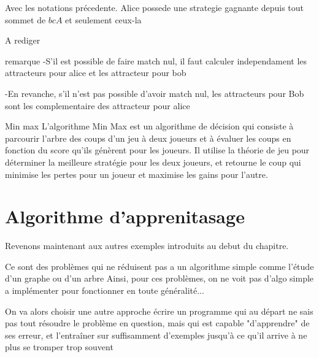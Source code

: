 \documentclass[a4paper,french,bookmarks]{article}
\begin{document}
    \begin{theorem}{}{}
        Avec les notations précedente. 
        Alice possede une strategie gagnante depuis tout sommet de $bcA$
        et seulement ceux-la 
    \end{theorem}
    \begin{nproof}{}{}
        A rediger
    \end{nproof}
    
    \begin{form}{remarque}{}
        \hspace{1cm}-S'il est possible de faire match nul, il faut calculer independament les attracteurs pour   alice et les attracteur pour bob
        
        
        \hspace{1cm}-En revanche, s'il n'est pas possible d'avoir match nul, les attracteurs pour Bob sont les complementaire des attracteur pour alice 
    \end{form}
    
    
    \begin{definition}{Min max}{}
        L'algorithme Min Max est un algorithme de décision qui consiste à parcourir l'arbre des coups d'un jeu à deux joueurs et à évaluer les coups en fonction du score qu'ils génèrent pour les joueurs. Il utilise la théorie de jeu pour déterminer la meilleure stratégie pour les deux joueurs, et retourne le coup qui minimise les pertes pour un joueur et maximise les gains pour l'autre.
        
    \end{definition}
    
    \section{Algorithme d'apprenitasage}
    
    Revenons maintenant aux autres exemples introduits au debut du chapitre.
    
    
        Ce sont des problèmes qui ne réduisent pas a un algorithme simple comme l'étude d'un graphe ou d'un arbre 
    Ainsi, pour ces problèmes, on ne voit pas d'algo simple a implémenter pour fonctionner en toute généralité...
    \vspace{0.1cm}
    
        On va alors choisir une autre approche écrire un programme qui au départ ne sais pas tout résoudre le problème
    en question, mais qui est capable "d'apprendre" de ses erreur, et l'entraîner sur suffisamment d'exemples jusqu'à ce qu'il arrive à ne plus se tromper trop souvent 
    
\end{document}
